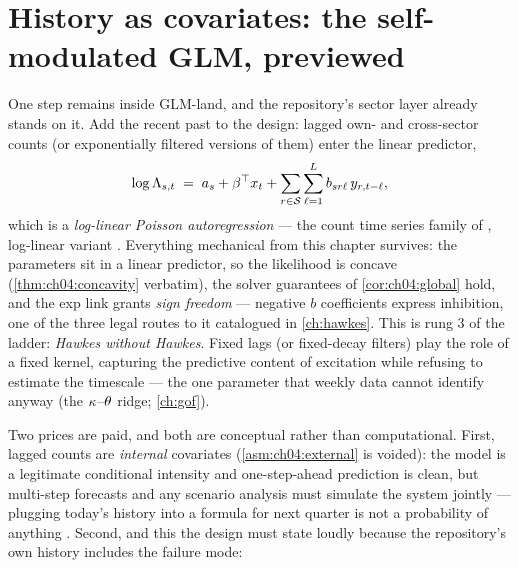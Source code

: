 \section{History as covariates: the self-modulated GLM, previewed}\label{ch04:sec:history}

One step remains inside GLM-land, and the repository's sector layer
already stands on it. Add the recent past to the design: lagged own- and
cross-sector counts (or exponentially filtered versions of them) enter
the linear predictor,
\begin{equation}\label{eq:ch04:autoregression}
\log \Lambda_{s,t}
 \;=\;
 a_s + \beta^{\top} x_t
 + \sum_{r \in \mathcal{S}} \sum_{\ell=1}^{L} b_{sr\ell}\, y_{r, t-\ell},
\end{equation}
which is a \emph{log-linear Poisson autoregression} --- the count time
series family of \citet{fokianos2009}, log-linear variant
\citet{fokianos2011}. Everything mechanical from this chapter survives:
the parameters sit in a linear predictor, so the likelihood is concave
(\cref{thm:ch04:concavity} verbatim), the solver guarantees of
\cref{cor:ch04:global} hold, and the exp link grants \emph{sign freedom}
--- negative $b$ coefficients express inhibition, one of the three legal
routes to it catalogued in \cref{ch:hawkes}. This is rung 3 of the
ladder: \emph{Hawkes without Hawkes}. Fixed lags (or fixed-decay filters)
play the role of a fixed kernel, capturing the predictive content of
excitation while refusing to estimate the timescale --- the one parameter
that weekly data cannot identify anyway (the $\kappa$--$\theta$ ridge;
\cref{ch:gof}).

Two prices are paid, and both are conceptual rather than computational.
First, lagged counts are \emph{internal} covariates
(\cref{asm:ch04:external} is voided): the model is a legitimate
conditional intensity and one-step-ahead prediction is clean, but
multi-step forecasts and any scenario analysis must simulate the system
jointly --- plugging today's history into a formula for next quarter is
not a probability of anything \citep{kalbfleisch2002}. Second, and this
the design must state loudly because the repository's own history
includes the failure mode:

